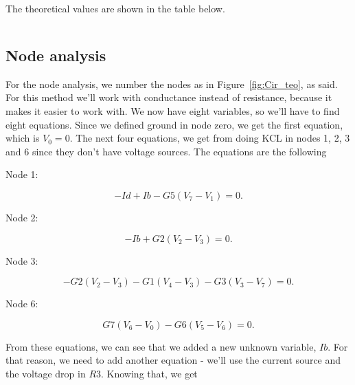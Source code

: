\par The theoretical values are shown in the table below.
\vspace{5mm}
\begin{table}[H]
\centering
\begin{tabularx}{0.8\textwidth} {
  | >{\raggedright\arraybackslash}X
  | >{\raggedleft\arraybackslash}X | }
 \hline

\end{tabularx}
\end{table}
\vspace{5mm}

\subsection{Node analysis}
\label{ssec:Node analysis}

\par For the node analysis, we number the nodes as in Figure~\ref{fig:Cir_teo}, as said. For this method we'll work with conductance instead of resistance, because it makes it easier to work with. We now have eight variables, so we'll have to find eight equations. Since we defined ground in node zero, we get the first equation, which is $V_0=0$. The next four equations, we get from doing KCL in nodes 1, 2, 3 and 6 since they don't have voltage sources. The equations are the following\\
\vspace{5mm}
\par Node 1:

 \begin{equation}
  -Id + Ib - G5(V_7-V_1) = 0.
  \label{eq:N1}
\end{equation}

Node 2:

 \begin{equation}
  -Ib + G2(V_2-V_3) = 0.
  \label{eq:N2}
\end{equation}

Node 3:

 \begin{equation}
  -G2(V_2-V_3)-G1(V_4-V_3)-G3(V_3-V_7) = 0.
  \label{eq:N3}
\end{equation}

Node 6:

 \begin{equation}
  G7(V_6-V_0)-G6(V_5-V_6) = 0.
  \label{eq:N6}
\end{equation}

\par From these equations, we can see that we added a new unknown variable, $Ib$. For that reason, we need to add another equation - we'll use the current source and the voltage drop in $R3$. Knowing that, we get

